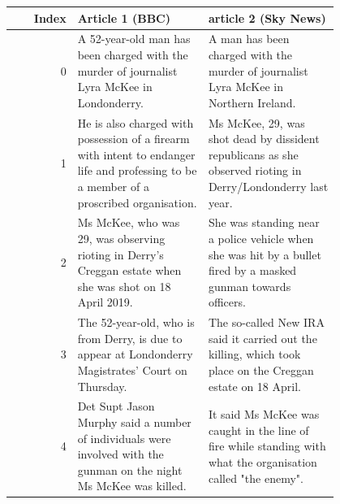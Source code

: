 
\begin{table}[!htbp]
        \centering
        \begin{tabular}{r | p{0.4\linewidth} | p{0.4\linewidth} }
        Index & Article 1 (BBC) & article 2 (Sky News) \\
        \hline
        0\vspace{-2px} & \tiny{A 52-year-old man has been charged with the murder of journalist Lyra McKee in Londonderry.}\vspace{-2px} & \tiny{A man has been charged with the murder of journalist Lyra McKee in Northern Ireland.}\vspace{-2px}\\
        1\vspace{-2px} & \tiny{He is also charged with possession of a firearm with intent to endanger life and professing to be a member of a proscribed organisation.}\vspace{-2px} & \tiny{Ms McKee, 29, was shot dead by dissident republicans as she observed rioting in Derry/Londonderry last year.}\vspace{-2px}\\
        2\vspace{-2px} & \tiny{Ms McKee, who was 29, was observing rioting in Derry's Creggan estate when she was shot on 18 April 2019. }\vspace{-2px}& \tiny{She was standing near a police vehicle when she was hit by a bullet fired by a masked gunman towards officers.}\vspace{-2px}\\
        3\vspace{-2px} & \tiny{The 52-year-old, who is from Derry, is due to appear at Londonderry Magistrates' Court on Thursday.}\vspace{-2px} & \tiny{The so-called New IRA said it carried out the killing, which took place on the Creggan estate on 18 April.}\vspace{-2px}\\
        4\vspace{-2px} & \tiny{Det Supt Jason Murphy said a number of individuals were involved with the gunman on the night Ms McKee was killed.}\vspace{-2px} & \tiny{It said Ms McKee was caught in the line of fire while standing with what the organisation called "the enemy".}\vspace{-2px}\\

\end{tabular}
\end{table}
